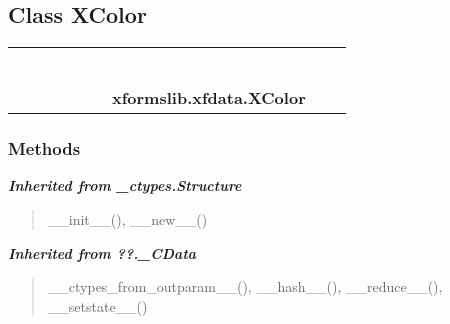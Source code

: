 
\subsection{Class XColor}

    \label{xformslib:xfdata:XColor}
\begin{tabular}{cccccccccc}
\multicolumn{2}{r}{\settowidth{\BCL}{object}\multirow{2}{\BCL}{object}}
&&
&&
&&
  \\\cline{3-3}
  &&\multicolumn{1}{c|}{}
&&
&&
&&
  \\
\multicolumn{4}{r}{\settowidth{\BCL}{??.\_CData}\multirow{2}{\BCL}{??.\_CData}}
&&
&&
  \\\cline{5-5}
  &&&&\multicolumn{1}{c|}{}
&&
&&
  \\
\multicolumn{6}{r}{\settowidth{\BCL}{\_ctypes.Structure}\multirow{2}{\BCL}{\_ctypes.Structure}}
&&
  \\\cline{7-7}
  &&&&&&\multicolumn{1}{c|}{}
&&
  \\
&&&&&&\multicolumn{2}{l}{\textbf{xformslib.xfdata.XColor}}
\end{tabular}



  \subsubsection{Methods}


\large{\textbf{\textit{Inherited from \_ctypes.Structure}}}

\begin{quote}
\_\_init\_\_(), \_\_new\_\_()
\end{quote}

\large{\textbf{\textit{Inherited from ??.\_CData}}}

\begin{quote}
\_\_ctypes\_from\_outparam\_\_(), \_\_hash\_\_(), \_\_reduce\_\_(), \_\_setstate\_\_()
\end{quote}

